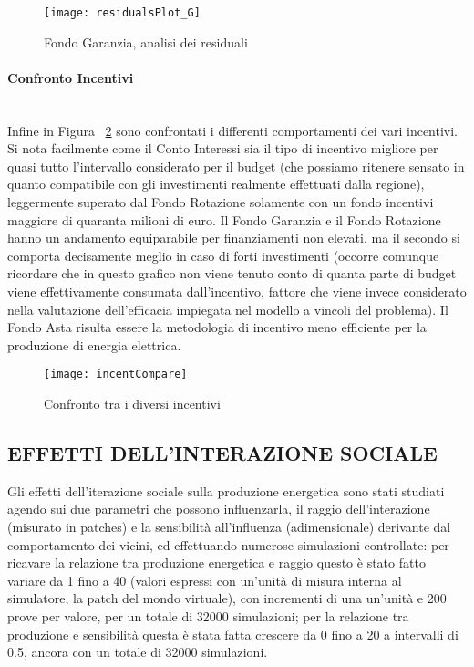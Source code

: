 \documentclass[12pt,a4paper,openright,twoside]{report}
\newcommand{\myparagraph}[1]{\paragraph{#1}\mbox{}\\}
\begin{document}
\begin{figure}[hbt]
	\centering
	\texttt{[image: residualsPlot\_G]}
	\caption{Fondo Garanzia, analisi dei residuali}
	\label{residualsPlot_G}
\end{figure}

\myparagraph{Confronto Incentivi}

Infine in Figura ~\ref{incentCompare} sono confrontati i differenti comportamenti dei vari incentivi. Si nota facilmente come il Conto Interessi sia il tipo di incentivo migliore per quasi tutto l'intervallo considerato per il budget (che possiamo ritenere sensato in quanto compatibile con gli investimenti realmente effettuati dalla regione), leggermente superato dal Fondo Rotazione solamente con un fondo incentivi maggiore di quaranta milioni di euro. Il Fondo Garanzia e il Fondo Rotazione hanno un andamento equiparabile per finanziamenti non elevati, ma il secondo si comporta decisamente meglio in caso di forti investimenti (occorre comunque ricordare che in questo grafico non viene tenuto conto di quanta parte di budget viene effettivamente consumata dall'incentivo, fattore che viene invece considerato nella valutazione dell'efficacia impiegata nel modello a vincoli del problema). Il Fondo Asta risulta essere la metodologia di incentivo meno efficiente per la produzione di energia elettrica.

\begin{figure}[hbt]
	\centering
	\texttt{[image: incentCompare]}
	\caption{Confronto tra i diversi incentivi}
	\label{incentCompare}
\end{figure}

\subsection{EFFETTI DELL'INTERAZIONE SOCIALE}

Gli effetti dell'iterazione sociale sulla produzione energetica sono stati studiati agendo sui due parametri che possono influenzarla, il raggio dell'interazione (misurato in patches) e la sensibilità all'influenza (adimensionale) derivante dal comportamento dei vicini, ed effettuando numerose simulazioni controllate: per ricavare la relazione tra produzione energetica e raggio questo è stato fatto variare da 1 fino a 40 (valori espressi con un'unità di misura interna al simulatore, la patch del mondo virtuale), con incrementi di una un'unità e 200 prove per valore, per un totale di 32000 simulazioni; per la relazione tra produzione e sensibilità questa è stata fatta crescere da 0 fino a 20 a intervalli di 0.5, ancora con un totale di 32000 simulazioni.
\end{document}
